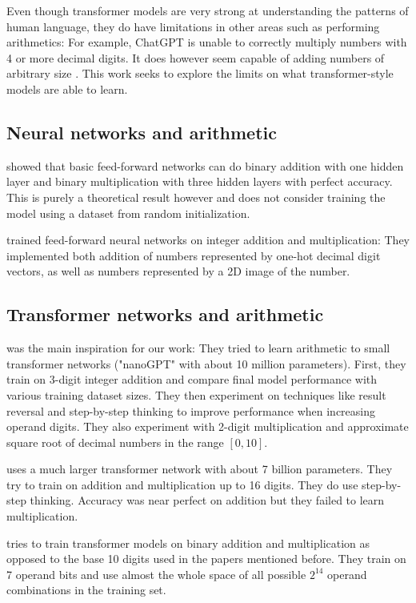 Even though transformer models are very strong at understanding the patterns of human language, they do have limitations in other areas such as performing arithmetics:
For example, ChatGPT is unable to correctly multiply numbers with 4 or more decimal digits. It does however seem capable of adding numbers of arbitrary size \cite{openai2023gpt4} .  This work seeks to explore the limits on what transformer-style models are able to learn.

\subsection{Neural networks and arithmetic}

\cite{solving} showed that basic feed-forward networks can do binary addition with one hidden layer and binary multiplication with three hidden layers with perfect accuracy. This is purely a theoretical result however and does not consider training the model using a dataset from random initialization.

\cite{visual} trained feed-forward neural networks on integer addition and multiplication: They implemented both addition of numbers represented by one-hot decimal digit vectors, as well as numbers represented by a 2D image of the number.

\subsection{Transformer networks and arithmetic}

\cite{teaching} was the main inspiration for our work: They tried to learn arithmetic to small transformer networks ("nanoGPT" with about 10 million parameters). First, they train on 3-digit integer addition and compare final model performance with various training dataset sizes. They then experiment on techniques like result reversal and step-by-step thinking to improve performance when increasing operand digits. They also experiment with 2-digit multiplication and approximate square root of decimal numbers in the range $[0,10]$.

\cite{goat} uses a much larger transformer network with about 7 billion parameters. They try to train on addition and multiplication up to 16 digits. They do use step-by-step thinking. Accuracy was near perfect on addition but they failed to learn multiplication.

\cite{memtocomp} tries to train transformer models on binary addition and multiplication as opposed to the base 10 digits used in the papers mentioned before. They train on 7 operand bits and use almost the whole space of all possible $2^{14}$ operand combinations in the training set.

